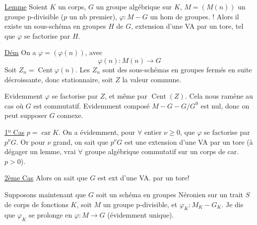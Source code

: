 \uline{Lemme} Soient $K$ un corps, $G$ un groupe algébrique sur $K$, $M=(M(n))$ un groupe p-divisible ($p$ un nb premier),  $\varphi:M\mathbin{-}G$ un hom de groupes. ! Alors  il existe un sous-schéma en groupes $H$ de $G$, extension d'une VA par un tore, tel que $\varphi$ se factorise par $H$.

\uline{Dém} On a $\varphi=(\varphi(n))$, avec
\[
\varphi(n):M(n)\longrightarrow G
\]
Soit $Z_n=\operatorname{Cent}\varphi(n)$. Les $Z_n$ sont des sous-schémas en groupes fermés en suite décroissante, donc stationnaire, soit $Z$ la valeur commune.

Evidemment $\varphi$ se factorise par  $Z$, et même par $\operatorname{Cent}(Z)$. Cela nous ramène au cas où $G$ est commutatif. Evidemment   composé $M\mathbin{-}G\mathbin{-}G/G^0$ est nul, donc on peut supposer $G$ connexe.

\uline{1º Cas} $p=\operatorname{car}K$. On a évidemment, pour $\forall$ entier $\nu\geq0$, que $\varphi$ se factorise par $p^\nu G$. Or pour $\nu$ grand, on sait  que $p^\nu G$ est une extension d'une VA par un tore (à dégager un lemme, vrai $\forall$ groupe algébrique commutatif sur un corps de car. $p>0$).

\uline{2ème Cas}  
Alors on sait que $G$ est ext d'une VA. par un tore!



Supposons maintenant que $G$ soit un schéma en groupes Néronien sur un trait $S$ de corps de fonctions $K$, soit $M$ un groupe p-divisible, et $\varphi_K:M_K\mathbin{-}G_K$. Je dis que $\varphi_K$ se prolonge en $\varphi:M\longrightarrow G$ (évidemment unique).

